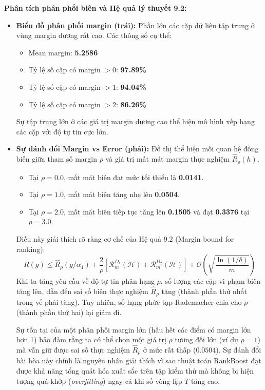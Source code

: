 \textbf{Phân tích phân phối biên và Hệ quả lý thuyết 9.2:}
\begin{itemize}
    \item \textbf{Biểu đồ phân phối margin (trái):} Phần lớn các cặp dữ liệu tập trung ở vùng margin dương rất cao. Các thông số cụ thể:
    \begin{itemize}
        \item Mean margin: \textbf{5.2586}
        \item Tỷ lệ số cặp có margin $> 0$: \textbf{97.89\%}
        \item Tỷ lệ số cặp có margin $> 1$: \textbf{94.04\%}
        \item Tỷ lệ số cặp có margin $> 2$: \textbf{86.26\%}
    \end{itemize}
    Sự tập trung lớn ở các giá trị margin dương cao thể hiện mô hình xếp hạng các cặp với độ tự tin cực lớn.
    \item \textbf{Sự đánh đổi Margin vs Error (phải):} Đồ thị thể hiện mối quan hệ đồng biến giữa tham số margin $\rho$ và giá trị mất mát margin thực nghiệm $\widehat{R}_\rho(h)$.
    \begin{itemize}
        \item Tại $\rho = 0.0$, mất mát biên đạt mức tối thiểu là \textbf{0.0141}.
        \item Tại $\rho = 1.0$, mất mát biên tăng nhẹ lên \textbf{0.0504}.
        \item Tại $\rho = 2.0$, mất mát biên tiếp tục tăng lên \textbf{0.1505} và đạt \textbf{0.3376} tại $\rho = 3.0$.
    \end{itemize}
    Điều này giải thích rõ ràng cơ chế của Hệ quả 9.2 (Margin bound for ranking):
    \begin{equation}
        R(g) \le \widehat{R}_{\rho}(g/\alpha_1) + \frac{2}{\rho}\left[\mathcal{R}_{m}^{D_1}(\mathcal{H}) + \mathcal{R}_{m}^{D_2}(\mathcal{H})\right] + \mathcal{O}\left(\sqrt{\frac{\ln(1/\delta)}{m}}\right)
    \end{equation}
    Khi ta tăng yêu cầu về độ tự tin phân hạng $\rho$, số lượng các cặp vi phạm biên tăng lên, dẫn đến sai số biên thực nghiệm $\widehat{R}_\rho$ tăng (thành phần thứ nhất trong vế phải tăng). Tuy nhiên, số hạng phức tạp Rademacher chia cho $\rho$ (thành phần thứ hai) lại giảm đi. 
    
    Sự tồn tại của một phân phối margin lớn (hầu hết các điểm có margin lớn hơn 1) bảo đảm rằng ta có thể chọn một giá trị $\rho$ tương đối lớn (ví dụ $\rho = 1$) mà vẫn giữ được sai số thực nghiệm $\widehat{R}_\rho$ ở mức rất thấp ($0.0504$). Sự đánh đổi hài hòa này chính là nguyên nhân giải thích vì sao thuật toán RankBoost đạt được khả năng tổng quát hóa xuất sắc trên tập kiểm thử mà không bị hiện tượng quá khớp (\textit{overfitting}) ngay cả khi số vòng lặp $T$ tăng cao.
\end{itemize}

